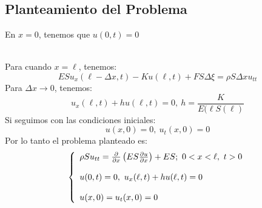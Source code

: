 \documentclass[../main]{subfiles}
\begin{document}
\begin{enumerate}
    \subsection*{Planteamiento del Problema}
    \begin{minipage}{0.5\textwidth}
    En $x=0$, tenemos que $u(0,t)=0$  
    \end{minipage}
    \begin{minipage}{0.5\textwidth}
        
    \end{minipage}\\[0.5cm]
    Para cuando $x=\ell$, tenemos:
    \begin{equation}
        ES u_x(\ell-\Delta x,t)-Ku(\ell,t)+FS \Delta \xi = \rho S \Delta x u_{tt}
    \end{equation}
    Para $\Delta x \rightarrow 0$, tenemos:
    \begin{equation}
        u_{x}(\ell,t)+hu(\ell,t)=0, \ h=\dfrac{K}{E(\ell S(\ell)}
    \end{equation}
    Si seguimos con las condiciones iniciales:
    $$
    u(x,0)=0, \ u_t (x,0)=0
    $$
    Por lo tanto el problema planteado es:
    $$
    \left\{ \begin{array}{ll}
             \rho S u_{tt}=\pdv{}{x}\left( E S \pdv{u}{x}\right)+ ES; \ 0<x<\ell, \ t>0 \\ \\
             u(0, t)=0, \ u_x (\ell,t)+h u(\ell, t)=0\\ \\
             u(x, 0)=u_t (x,0)=0 \end{array} \right. 
    $$
\end{enumerate}
\end{document}
